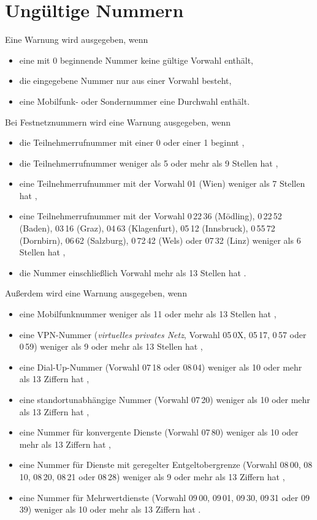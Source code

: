 \documentclass[numbers=noenddot]{scrreprt}
\newcommand\UeberschriftUngueltig{\section{Ungültige Nummern}}
\newcommand\WarnungWenn{Eine Warnung wird ausgegeben, wenn}
\begin{document}
\UeberschriftUngueltig
\WarnungWenn
\begin{itemize}
\item eine mit 0 beginnende Nummer keine gültige Vorwahl enthält,
\item die eingegebene Nummer nur aus einer Vorwahl besteht,
\item eine Mobilfunk- oder Sondernummer eine Durchwahl enthält.
\end{itemize}
Bei Festnetznummern wird eine Warnung ausgegeben, wenn
\begin{itemize}
\item die Teilnehmerrufnummer mit einer 0 oder einer 1 beginnt \cite[§\,50 (9)]{RTR-Verordnung},
\item die Teilnehmerrufnummer weniger als 5 oder mehr als 9 Stellen hat \cite[§\,50 (3) u. (5)]{RTR-Verordnung},
\item eine Teilnehmerrufnummer mit der Vorwahl 01 (Wien) weniger als 7 Stellen hat \cite[§\,50 (4)]{RTR-Verordnung},
\item eine Teilnehmerrufnummer mit der Vorwahl
0\,22\,36 (Mödling), 0\,22\,52 (Baden), 03\,16 (Graz), 04\,63 (Klagenfurt), 05\,12 (Innsbruck), 0\,55\,72 (Dornbirn), 06\,62 (Salzburg), 0\,72\,42 (Wels) oder 07\,32 (Linz)
weniger als 6 Stellen hat \cite[§\,50 (4)]{RTR-Verordnung},
\item die Nummer einschließlich Vorwahl mehr als 13 Stellen hat \cite[§\,50 (5)]{RTR-Verordnung}.
\end{itemize}
Außerdem wird eine Warnung ausgegeben, wenn
\begin{itemize}
\item eine Mobilfunknummer weniger als 11 oder mehr als 13 Stellen hat \cite[§\,61 (1)]{RTR-Verordnung},
\item eine VPN-Nummer (\emph{virtuelles privates Netz}, Vorwahl
05\,0X, 05\,17, 0\,57 oder 0\,59)
weniger als 9 oder mehr als 13 Stellen hat \cite[§\,56 (1) u. §\,4 (4)]{RTR-Verordnung},
\item eine Dial-Up-Nummer (Vorwahl
07\,18 oder 08\,04)
weniger als 10 oder mehr als 13 Ziffern hat \cite[§\,66]{RTR-Verordnung},
\item eine standortunabhängige Nummer (Vorwahl
07\,20)
weniger als 10 oder mehr als 13 Ziffern hat \cite[§\,71]{RTR-Verordnung},
\item eine Nummer für konvergente Dienste (Vorwahl
07\,80)
weniger als 10 oder mehr als 13 Ziffern hat \cite[§\,76]{RTR-Verordnung},
\item eine Nummer für Dienste mit geregelter Entgeltobergrenze (Vorwahl
08\,00, 08\,10, 08\,20, 08\,21 oder 08\,28)
weniger als 9 oder mehr als 13 Ziffern hat \cite[§\,81]{RTR-Verordnung},
\item eine Nummer für Mehrwertdienste (Vorwahl
09\,00, 09\,01, 09\,30, 09\,31 oder 09\,39)
weniger als 10 oder mehr als 13 Ziffern hat \cite[§\,87]{RTR-Verordnung}.
\end{itemize}
\end{document}
